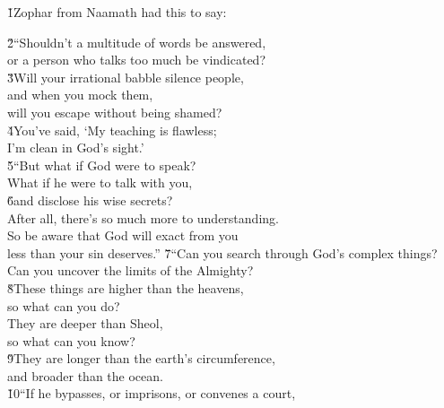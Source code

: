 \v{1}Zophar from Naamath had this to say:

\begin{poetry}
\poeml \v{2}``Shouldn't a multitude of words be answered, \\
\poemll    or a person who talks too much be vindicated? \\
\poeml \v{3}Will your irrational babble silence people, \\
\poemll    and when you mock them, \\
\poemlll       will you escape without being shamed? \\
\poeml \v{4}You've said, `My teaching is flawless; \\
\poemll    I'm clean in God's sight.' \\
\poeml \v{5}``But what if God were to speak? \\
\poemll    What if he were to talk with you, \\
\poeml \v{6}and disclose his wise secrets? \\
\poeml After all, there's so much more to understanding. \\
\poemll    So be aware that God will exact from you \\
\poemlll       less than your sin deserves.''
\poeml \v{7}``Can you search through God's complex things? \\
\poemll    Can you uncover the limits of the Almighty? \\
\poeml \v{8}These things are higher than the heavens, \\
\poemll    so what can you do? \\
\poeml They are deeper than Sheol, \\
\poemll    so what can you know? \\
\poeml \v{9}They are longer than the earth's circumference, \\
\poemll    and broader than the ocean. \\
\poeml \v{10}``If he bypasses, or imprisons, or convenes a court, \\

\end{poetry}
